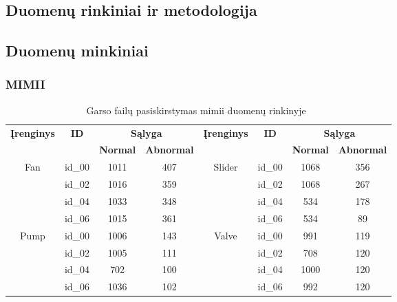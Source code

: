 \subsection*{Duomenų rinkiniai ir metodologija}\label{chap:twolt}
\subsection*{Duomenų minkiniai}
\subsubsection*{MIMII}
\begin{table}[!ht]
	\centering
	\caption[Garso failų pasiskirstymas MIMII duomenų rinkinyje]{Garso failų pasiskirstymas \gls{mimii} duomenų rinkinyje~\cite{Purohit2019}}
	\label{tab:mimii_datasetslt}
	\renewcommand{\arraystretch}{1.2}
	\small
	\begin{tabular}{|c|c|c|c|c|c|c|c|}
		\hline
		\multirow{2}{*}{\textbf{Įrenginys}} & \multirow{2}{*}{\textbf{ID}} & \multicolumn{2}{c|}{\textbf{Sąlyga}}&\multirow{2}{*}{\textbf{Įrenginys}} & \multirow{2}{*}{\textbf{ID}} & \multicolumn{2}{c|}{\textbf{Sąlyga}}\\
		\cline{3-4}
		\cline{7-8}
		&&\textbf{Normal} & \textbf{Abnormal}&&&\textbf{Normal} & \textbf{Abnormal}\\
		\hline
		\multirow{4}{*}{Fan} & id\_00 & 1011 & 407&\multirow{4}{*}{Slider} & id\_00 & 1068 & 356\\
		\cline{2-4}
		\cline{6-8}
		& id\_02 & 1016& 359&& id\_02 & 1068 & 267\\
		\cline{2-4}
		\cline{6-8}
		& id\_04 & 1033 & 348&& id\_04 & 534 & 178\\
		\cline{2-4}
		\cline{6-8}
		& id\_06 & 1015 &361&& id\_06 & 534 & 89\\
		\hline
		\multirow{4}{*}{Pump} & id\_00 & 1006 & 143&\multirow{4}{*}{Valve} & id\_00 & 991 & 119\\
		\cline{2-4}
		\cline{6-8}
		& id\_02 & 1005 & 111&& id\_02 & 708 & 120\\
		\cline{2-4}
		\cline{6-8}
		& id\_04 & 702 & 100&& id\_04 & 1000 & 120\\
		\cline{2-4}
		\cline{6-8}
		& id\_06 & 1036 & 102&& id\_06 & 992 & 120\\
		\hline
	\end{tabular}
\end{table}
